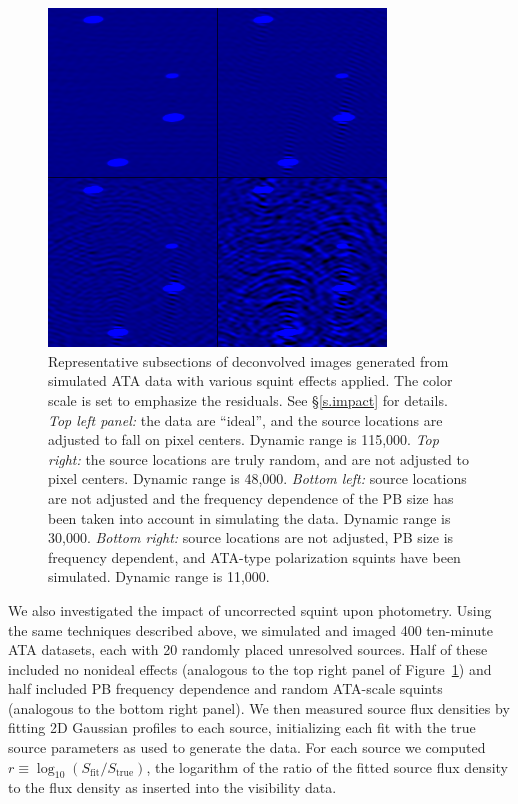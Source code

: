 \documentclass[preprint]{aastex}
\begin{document}
\begin{figure}[htb]
\begin{center}
\includegraphics[width=0.8\textwidth]{images/squintsims}
\caption{Representative subsections of deconvolved images generated
  from simulated ATA data with various squint effects applied. The
  color scale is set to emphasize the residuals. See \S\ref{s.impact}
  for details. \textit{Top left panel:} the data are ``ideal'', and
  the source locations are adjusted to fall on pixel centers. Dynamic
  range is 115,000. \textit{Top right:} the source locations are truly
  random, and are not adjusted to pixel centers. Dynamic range is
  48,000. \textit{Bottom left:} source locations are not adjusted and
  the frequency dependence of the PB size has been taken into account
  in simulating the data. Dynamic range is 30,000. \textit{Bottom
    right:} source locations are not adjusted, PB size is frequency
  dependent, and ATA-type polarization squints have been
  simulated. Dynamic range is 11,000.
  \label{fig.squintsims}}
\end{center}
\end{figure}

We also investigated the impact of uncorrected squint upon
photometry. Using the same techniques described above, we simulated
and imaged 400 ten-minute ATA datasets, each with 20 randomly placed
unresolved sources. Half of these included no nonideal effects
(analogous to the top right panel of Figure~\ref{fig.squintsims}) and
half included PB frequency dependence and random ATA-scale squints
(analogous to the bottom right panel). We then measured source flux
densities by fitting 2D Gaussian profiles to each source, initializing
each fit with the true source parameters as used to generate the
data. For each source we computed $r \equiv \log_{10}(S_\textrm{fit} /
S_\textrm{true})$, the logarithm of the ratio of the fitted source
flux density to the flux density as inserted into the visibility data.
\end{document}
